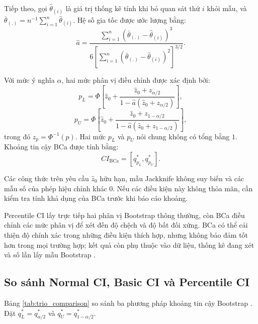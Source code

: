 Tiếp theo, gọi $\hat{\theta}_{(i)}$ là giá trị thống kê tính khi bỏ quan sát
thứ $i$ khỏi mẫu, và
$\bar{\theta}_{(.)}=n^{-1}\sum_{i=1}^{n}\hat{\theta}_{(i)}$. Hệ số gia tốc
được ước lượng bằng:
\begin{equation}
	\widehat{a}
	=
	\frac{
		\displaystyle\sum_{i=1}^{n}
		\left(\bar{\theta}_{(.)}-\hat{\theta}_{(i)}\right)^3
	}{
		\displaystyle
		6\left[
		\sum_{i=1}^{n}
		\left(\bar{\theta}_{(.)}-\hat{\theta}_{(i)}\right)^2
		\right]^{3/2}
	}.
\end{equation}

Với mức ý nghĩa $\alpha$, hai mức phân vị điều chỉnh được xác định bởi:
\begin{equation}
	p_L
	=
	\Phi\left[
	\widehat{z}_0+
	\frac{\widehat{z}_0+z_{\alpha/2}}
	{1-\widehat{a}(\widehat{z}_0+z_{\alpha/2})}
	\right],
\end{equation}
\begin{equation}
	p_U
	=
	\Phi\left[
	\widehat{z}_0+
	\frac{\widehat{z}_0+z_{1-\alpha/2}}
	{1-\widehat{a}(\widehat{z}_0+z_{1-\alpha/2})}
	\right],
\end{equation}
trong đó $z_p=\Phi^{-1}(p)$. Hai mức $p_L$ và $p_U$ nói chung không có tổng bằng $1$. Khoảng tin cậy BCa được tính bằng:
\begin{equation}
	CI_{\mathrm{BCa}}
	=
	\left[
	q_{p_L}^{*},
	q_{p_U}^{*}
	\right].
\end{equation}

Các công thức trên yêu cầu $\widehat z_0$ hữu hạn, mẫu Jackknife không suy biến và các mẫu số của phép hiệu chỉnh khác $0$. Nếu các điều kiện này không thỏa mãn, cần kiểm tra tính khả dụng của BCa trước khi báo cáo khoảng.

Percentile CI lấy trực tiếp hai phân vị Bootstrap thông thường, còn BCa
điều chỉnh các mức phân vị để xét đến độ chệch và độ bất đối xứng.
BCa có thể cải thiện độ chính xác trong những điều kiện thích hợp, nhưng
không bảo đảm tốt hơn trong mọi trường hợp; kết quả còn phụ thuộc vào dữ
liệu, thống kê đang xét và số lần lấy mẫu Bootstrap
\cite{efron1993, davison1997}.
\subsection{So sánh Normal CI, Basic CI và Percentile CI}

Bảng \ref{tab:trio_comparison} so sánh ba phương pháp khoảng tin cậy Bootstrap \cite{efron1993, davison1997}. Đặt $q_L^*=q_{\alpha/2}^*$ và $q_U^*=q_{1-\alpha/2}^*$.

